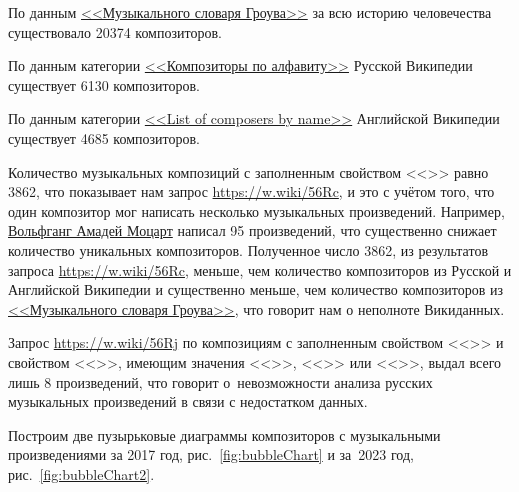 По данным \href{https://ru.wikipedia.org/wiki/Музыкальный_словарь_Гроува}{<<Музыкального словаря Гроува>>} за всю историю человечества существовало \num{20374} композиторов.


По данным категории \href{https://ru.wikipedia.org/wiki/Категория:Композиторы_по_алфавиту}{<<Композиторы по алфавиту>>} Русской Википедии существует \num{6130} композиторов.


По данным категории \href{https://en.wikipedia.org/wiki/List_of_composers_by_name}{<<List of composers by name>>} Английской Википедии существует \num{4685} композиторов.


Количество музыкальных композиций с заполненным свойством <<>> равно \num{3862}, что показывает нам запрос \href{https://w.wiki/56Rc}{https://w.wiki/56Rc}, и это с учётом того, что один композитор мог написать несколько музыкальных произведений. Например, \href{https://ru.wikipedia.org/wiki/Моцарт,_Вольфганг_Амадей}{Вольфганг Амадей Моцарт} написал \num{95} произведений, что существенно снижает количество уникальных композиторов. Полученное число \num{3862}, из результатов запроса \href{https://w.wiki/56Rc}{https://w.wiki/56Rc}, меньше, чем количество композиторов из Русской и Английской Википедии и существенно меньше, чем количество композиторов из \href{https://ru.wikipedia.org/wiki/Музыкальный_словарь_Гроува}{<<Музыкального словаря Гроува>>}, что говорит нам о неполноте Викиданных.

Запрос \href{https://w.wiki/56Rj}{https://w.wiki/56Rj} по композициям с заполненным свойством <<>> и свойством <<>>, имеющим значения <<>>, <<>> или <<>>, выдал всего лишь \num{8} произведений, что говорит о~невозможности анализа русских музыкальных произведений в связи с недостатком данных.

Построим  две пузырьковые диаграммы композиторов с музыкальными произведениями за 2017 год, рис.~\ref{fig:bubbleChart} и за~2023 год, рис.~\ref{fig:bubbleChart2}.

